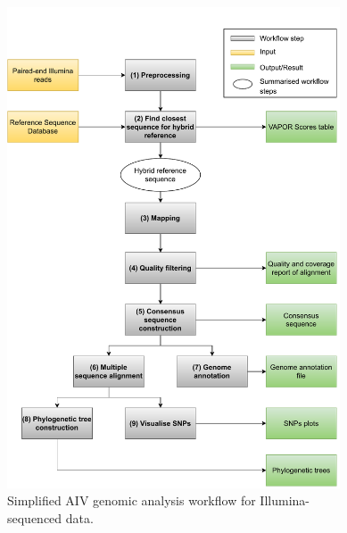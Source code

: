 \begin{figure}[ht!]
	\includegraphics[width=0.88\textwidth]{media/3-aiv.pdf}
	\caption{Simplified \ac{AIV} genomic analysis workflow for Illumina-\\sequenced data.}
	\label{fig:3-aiv-wf}
\end{figure}


